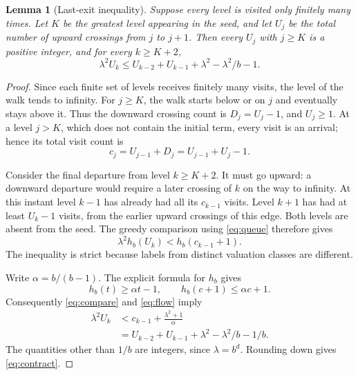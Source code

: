 \documentclass[10pt]{article}
\newtheorem{lemma}{Lemma}
\begin{document}
\begin{lemma}[Last-exit inequality]\label{lem:last}
Suppose every level is visited only finitely many times. Let $K$ be
the greatest level appearing in the seed, and let $U_j$ be the total
number of upward crossings from $j$ to $j+1$. Then every $U_j$ with
$j\ge K$ is a positive integer, and for every $k\ge K+2$,
\begin{equation}\label{eq:contract}
 \lambda^2 U_k\le U_{k-2}+U_{k-1}
                 +\lambda^2-\lambda^2/b-1.
\end{equation}
\end{lemma}
\begin{proof}
Since each finite set of levels receives finitely many visits, the
level of the walk tends to infinity. For $j\ge K$, the walk starts
below or on $j$ and eventually stays above it. Thus the downward
crossing count is $D_j=U_j-1$, and $U_j\ge1$. At a level $j>K$, which
does not contain the initial term, every visit is an arrival; hence its
total visit count is
\begin{equation}\label{eq:flow}
 c_j=U_{j-1}+D_j=U_{j-1}+U_j-1.
\end{equation}

Consider the final departure from level $k\ge K+2$. It must go upward:
a downward departure would require a later crossing of $k$ on the way
to infinity. At this instant level $k-1$ has already had all its
$c_{k-1}$ visits. Level $k+1$ has had at least $U_k-1$ visits, from the
earlier upward crossings of this edge. Both levels are absent from
the seed. The greedy comparison using \eqref{eq:queue} therefore gives
\begin{equation}\label{eq:compare}
 \lambda^2 h_b(U_k)<h_b(c_{k-1}+1).
\end{equation}
The inequality is strict because labels from distinct valuation classes
are different.

Write $\alpha=b/(b-1)$. The explicit formula for $h_b$ gives
\[
 h_b(t)\ge\alpha t-1,\qquad h_b(c+1)\le\alpha c+1.
\]
Consequently \eqref{eq:compare} and \eqref{eq:flow} imply
\begin{align*}
 \lambda^2 U_k
 &<c_{k-1}+\frac{\lambda^2+1}{\alpha}\\
 &=U_{k-2}+U_{k-1}+\lambda^2-\lambda^2/b-1/b.
\end{align*}
The quantities other than $1/b$ are integers, since $\lambda=b^d$.
Rounding down gives \eqref{eq:contract}.
\end{proof}
\end{document}
